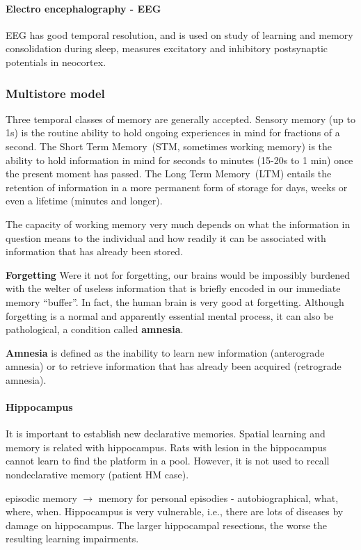 \documentclass[12pt,article,oneside,a4paper]{memoir}
\begin{document}
\paragraph{Electro encephalography - EEG}

EEG has good temporal resolution, and is used on study of learning and memory
consolidation during sleep, measures excitatory and inhibitory postsynaptic
potentials in neocortex.

\subsubsection{Multistore model}
Three temporal classes of memory are generally accepted.
Sensory memory (up to 1s) is the routine ability to hold ongoing experiences
in mind for fractions of a second. The Short Term Memory~(STM, sometimes
working memory) is the ability to hold information in mind for seconds to
minutes (15-20s to 1 min) once the present moment has passed. The Long Term
Memory~(LTM) entails the retention of information in a more permanent form of
storage for days, weeks or even a lifetime (minutes and longer).

The capacity of working memory very much depends on what the information in
question means to the individual and how readily it can be associated with
information that has already been stored.

\textbf{Forgetting} Were it not for forgetting, our brains would be impossibly
burdened with the welter of useless information that is briefly encoded in our
immediate memory ``buffer''. In fact, the human brain is very good at
forgetting.
Although forgetting is a normal and apparently essential mental process, it can
also be pathological, a condition called \textbf{amnesia}.

\textbf{Amnesia} is defined as the inability to learn new information
(anterograde amnesia) or to retrieve information that has already been acquired
(retrograde amnesia).

\paragraph{Hippocampus}
It is important to establish new declarative memories.
Spatial learning and memory is related with hippocampus. Rats with lesion in
the hippocampus cannot learn to find the platform in a pool. However, it is not
used to recall nondeclarative memory (patient HM case).

episodic memory $\rightarrow$ memory for personal
episodies - autobiographical, what, where, when.
Hippocampus is very vulnerable, i.e., there are lots of diseases by damage on
hippocampus. The larger hippocampal resections, the worse the resulting
learning impairments.
\end{document}
